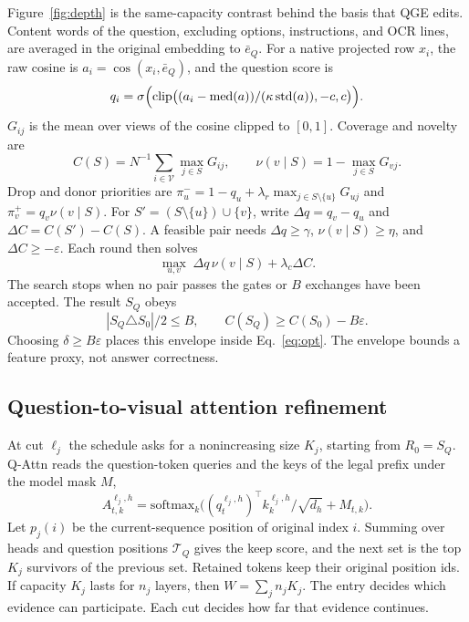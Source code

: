Figure~\ref{fig:depth} is the same-capacity contrast behind the basis that QGE edits. Content words of the question, excluding options, instructions, and OCR lines, are averaged in the original embedding to $\bar e_Q$. For a native projected row $x_i$, the raw cosine is $a_i=\cos(x_i,\bar e_Q)$, and the question score is
\begin{equation}
q_i=\sigma\Bigl(\mathrm{clip}\bigl((a_i-\mathrm{med}(a))/(\kappa\,\mathrm{std}(a)),-c,c\bigr)\Bigr).
\label{eq:q}
\end{equation}
$G_{ij}$ is the mean over views of the cosine clipped to $[0,1]$. Coverage and novelty are
\begin{equation}
C(S)=N^{-1}\sum_{i\in\mathcal{V}}\max_{j\in S}G_{ij},\qquad
\nu(v\mid S)=1-\max_{j\in S}G_{vj}.
\label{eq:cov}
\end{equation}
Drop and donor priorities are $\pi^{-}_{u}=1-q_u+\lambda_r\max_{j\in S\setminus\{u\}}G_{uj}$ and $\pi^{+}_{v}=q_v\nu(v\mid S)$. For $S'=(S\setminus\{u\})\cup\{v\}$, write $\Delta q=q_v-q_u$ and $\Delta C=C(S')-C(S)$. A feasible pair needs $\Delta q\ge\gamma$, $\nu(v\mid S)\ge\eta$, and $\Delta C\ge-\varepsilon$. Each round then solves
\begin{equation}
\max_{u,v}\;\Delta q\,\nu(v\mid S)+\lambda_c\Delta C.
\label{eq:swap}
\end{equation}
The search stops when no pair passes the gates or $B$ exchanges have been accepted. The result $S_Q$ obeys
\begin{equation}
|S_Q\triangle S_0|/2\le B,\qquad C(S_Q)\ge C(S_0)-B\varepsilon.
\label{eq:env}
\end{equation}
Choosing $\delta\ge B\varepsilon$ places this envelope inside Eq.~\eqref{eq:opt}. The envelope bounds a feature proxy, not answer correctness.

\subsection{Question-to-visual attention refinement}
At cut $\ell_j$ the schedule asks for a nonincreasing size $K_j$, starting from $R_0=S_Q$. Q-Attn reads the question-token queries and the keys of the legal prefix under the model mask $M$,
\begin{equation}
A^{\ell_j,h}_{t,k}=\mathrm{softmax}_{k}\bigl((q^{\ell_j,h}_t)^{\top}k^{\ell_j,h}_k/\sqrt{d_h}+M_{t,k}\bigr).
\label{eq:attn}
\end{equation}
Let $p_j(i)$ be the current-sequence position of original index $i$. Summing over heads and question positions $\mathcal{T}_Q$ gives the keep score, and the next set is the top $K_j$ survivors of the previous set. Retained tokens keep their original position ids. If capacity $K_j$ lasts for $n_j$ layers, then $W=\sum_j n_j K_j$. The entry decides which evidence can participate. Each cut decides how far that evidence continues.
